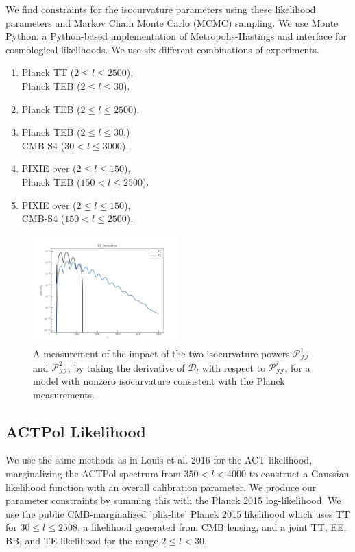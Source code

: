 \documentclass{emulateapj}
\newcommand\pii{ \mathcal{P}_{\mathcal{I}\mathcal{I}} }
\begin{document}
We find constraints for the isocurvature parameters using these likelihood parameters and Markov Chain Monte Carlo (MCMC) sampling. We use Monte Python, a Python-based implementation of Metropolis-Hastings and interface for cosmological likelihoods. We use six different combinations of experiments.
\begin{enumerate}
\item Planck TT ($2 \leq l \leq 2500$), \\ Planck TEB ($2 \leq l \leq 30$).
\item Planck TEB ($2 \leq l \leq 2500$).
\item Planck TEB ($2 \leq l \leq 30$,) \\CMB-S4 ($30 < l \leq 3000$).
\item PIXIE over ($2 \leq l \leq 150$),\\ Planck TEB ($150 < l  \leq 2500$).
\item PIXIE over ($2 \leq l \leq 150$),\\ CMB-S4 ($150 < l  \leq 2500$).
\end{enumerate}

\begin{figure}
\includegraphics[width=0.5\textwidth]{figures/logee.pdf}
\caption{A measurement of the impact of the two isocurvature powers $\pii^1$ and $\pii^2$, by taking the derivative of $\mathcal{D}_l$ with respect to $\pii^i$, for a model with nonzero isocurvature consistent with the Planck measurements.\label{fig:derivs}}
\end{figure}


\subsection{ACTPol Likelihood}

We use the same methods as in Louis et al. 2016 for the ACT likelihood, marginalizing the ACTPol spectrum from $350 < l < 4000$ to construct a Gaussian likelihood function with an overall calibration parameter. We produce our parameter constraints by summing this with the Planck 2015 log-likelihood. We use the public CMB-marginalized 'plik-lite' Planck 2015 likelihood which uses TT for $30 \leq l \leq 2508$, a likelihood generated from CMB lensing, and a joint TT, EE, BB, and TE likelihood for the range $2 \leq l < 30$.
\end{document}
